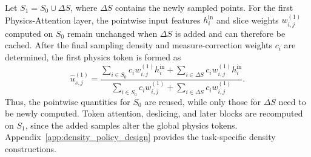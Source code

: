\documentclass{article}
\def\eqref#1{equation~\ref{#1}}
\begin{document}
Let $S_1=S_0\cup\Delta S$, where $\Delta S$ contains the newly sampled points.
For the first Physics-Attention layer, the pointwise input features
$h_i^{\mathrm{in}}$ and slice weights $w_{i,j}^{(1)}$ computed on $S_0$
remain unchanged when $\Delta S$ is added and can therefore be cached.
After the final sampling density and measure-correction weights $c_i$ are
determined, the first physics token is formed as
\begin{equation}
    \widehat{u}_{s,j}^{(1)}
    =
    \frac{
        \sum_{i\in S_0} c_i w_{i,j}^{(1)}h_i^{\mathrm{in}}
        +
        \sum_{i\in\Delta S} c_i w_{i,j}^{(1)}h_i^{\mathrm{in}}
    }{
        \sum_{i\in S_0} c_i w_{i,j}^{(1)}
        +
        \sum_{i\in\Delta S} c_i w_{i,j}^{(1)}
    } .
    \label{eq:cache_aware_aggregation}
\end{equation}
Thus, the pointwise quantities for $S_0$ are reused, while only those for
$\Delta S$ need to be newly computed. Token attention, deslicing, and later
blocks are recomputed on $S_1$, since the added samples alter the global
physics tokens. Appendix~\ref{app:density_policy_design} provides the
task-specific density constructions.


\end{document}
